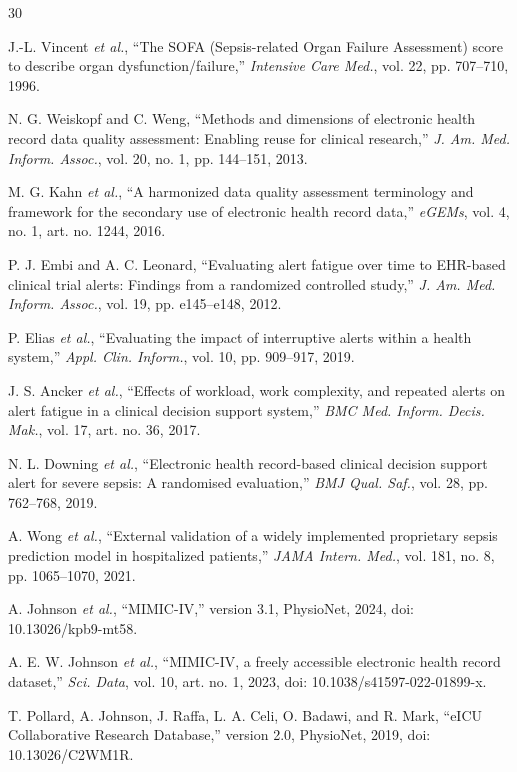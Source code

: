 \documentclass[journal]{IEEEtran}
\begin{document}
\begin{thebibliography}{30}

J.-L. Vincent \emph{et al.}, ``The SOFA (Sepsis-related Organ Failure
Assessment) score to describe organ dysfunction/failure,'' \emph{Intensive
Care Med.}, vol. 22, pp. 707--710, 1996.

N. G. Weiskopf and C. Weng, ``Methods and dimensions of electronic health
record data quality assessment: Enabling reuse for clinical research,''
\emph{J. Am. Med. Inform. Assoc.}, vol. 20, no. 1, pp. 144--151, 2013.

M. G. Kahn \emph{et al.}, ``A harmonized data quality assessment terminology
and framework for the secondary use of electronic health record data,''
\emph{eGEMs}, vol. 4, no. 1, art. no. 1244, 2016.

P. J. Embi and A. C. Leonard, ``Evaluating alert fatigue over time to
EHR-based clinical trial alerts: Findings from a randomized controlled
study,'' \emph{J. Am. Med. Inform. Assoc.}, vol. 19, pp. e145--e148, 2012.

P. Elias \emph{et al.}, ``Evaluating the impact of interruptive alerts within
a health system,'' \emph{Appl. Clin. Inform.}, vol. 10, pp. 909--917, 2019.

J. S. Ancker \emph{et al.}, ``Effects of workload, work complexity, and
repeated alerts on alert fatigue in a clinical decision support system,''
\emph{BMC Med. Inform. Decis. Mak.}, vol. 17, art. no. 36, 2017.

N. L. Downing \emph{et al.}, ``Electronic health record-based clinical
decision support alert for severe sepsis: A randomised evaluation,''
\emph{BMJ Qual. Saf.}, vol. 28, pp. 762--768, 2019.

A. Wong \emph{et al.}, ``External validation of a widely implemented
proprietary sepsis prediction model in hospitalized patients,'' \emph{JAMA
Intern. Med.}, vol. 181, no. 8, pp. 1065--1070, 2021.

A. Johnson \emph{et al.}, ``MIMIC-IV,'' version 3.1, PhysioNet, 2024,
doi: 10.13026/kpb9-mt58.

A. E. W. Johnson \emph{et al.}, ``MIMIC-IV, a freely accessible electronic
health record dataset,'' \emph{Sci. Data}, vol. 10, art. no. 1, 2023,
doi: 10.1038/s41597-022-01899-x.

T. Pollard, A. Johnson, J. Raffa, L. A. Celi, O. Badawi, and R. Mark,
``eICU Collaborative Research Database,'' version 2.0, PhysioNet, 2019,
doi: 10.13026/C2WM1R.


\end{thebibliography}
\end{document}
